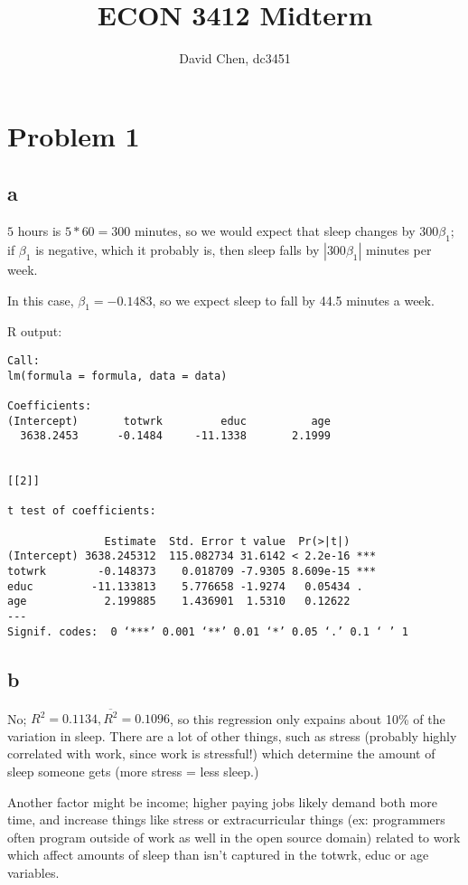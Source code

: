 \documentclass[12pt,letterpaper]{article}
\title{ECON 3412 Midterm}
\author{David Chen, dc3451}
\theoremstyle{definition}
\begin{document}
\maketitle

\section*{Problem 1}
\subsection*{a}

$5$ hours is $5 * 60 = 300$ minutes, so we would expect that sleep changes by $300\beta_{1}$; if $\beta_{1}$ is negative, which it probably is, then sleep falls by $|300\beta_{1}|$ minutes per week.

In this case, $\beta_{1} = -0.1483$, so we expect sleep to fall by 44.5 minutes a week.

R output:
\begin{Verbatim}[fontsize=\small]
Call:
lm(formula = formula, data = data)

Coefficients:
(Intercept)       totwrk         educ          age
  3638.2453      -0.1484     -11.1338       2.1999


[[2]]

t test of coefficients:

               Estimate  Std. Error t value  Pr(>|t|)
(Intercept) 3638.245312  115.082734 31.6142 < 2.2e-16 ***
totwrk        -0.148373    0.018709 -7.9305 8.609e-15 ***
educ         -11.133813    5.776658 -1.9274   0.05434 .
age            2.199885    1.436901  1.5310   0.12622
---
Signif. codes:  0 ‘***’ 0.001 ‘**’ 0.01 ‘*’ 0.05 ‘.’ 0.1 ‘ ’ 1
\end{Verbatim}

\subsection*{b}

No; $R^{2} = 0.1134, \overline{R^{2}} = 0.1096$, so this regression only expains about 10\% of the variation in sleep. There are a lot of other things, such as stress (probably highly correlated with work, since work is stressful!) which determine the amount of sleep someone gets (more stress = less sleep.)

Another factor might be income; higher paying jobs likely demand both more time, and increase things like stress or extracurricular things (ex: programmers often program outside of work as well in the open source domain) related to work which affect amounts of sleep than isn't captured in the totwrk, educ or age variables.
\end{document}
